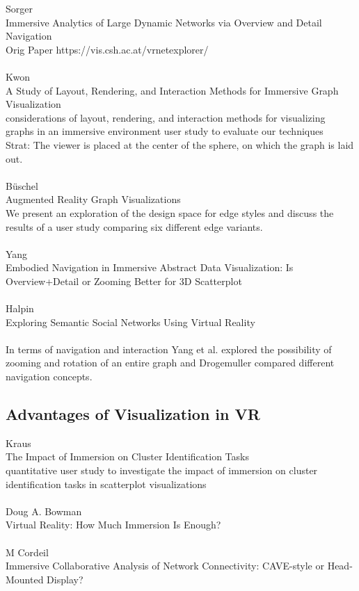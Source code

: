 Sorger\\
Immersive Analytics of Large Dynamic Networks via Overview and Detail Navigation\\
Orig Paper https://vis.csh.ac.at/vrnetexplorer/\\
\\
Kwon\\
A Study of Layout, Rendering, and Interaction Methods for Immersive Graph Visualization\\
considerations of layout, rendering, and interaction methods for visualizing graphs in an  immersive environment user study to evaluate our techniques\\
Strat: The viewer is placed at the center of the sphere, on which the graph is laid out.\\
\\
Büschel\\
Augmented Reality Graph Visualizations\\
We present an exploration of the design space for edge styles and discuss the results of a user study comparing six different edge variants.\\
\\
Yang\\
Embodied Navigation in Immersive Abstract Data Visualization:
Is Overview+Detail or Zooming Better for 3D Scatterplot\\
\\
Halpin\\
Exploring Semantic Social Networks Using Virtual Reality\\
\\

In terms of navigation and interaction Yang et al. \cite{yang_embodied_2020} explored the possibility of zooming and rotation of an entire graph and Drogemuller \cite{drogemuller_examining_2020} compared different navigation concepts.

\subsection{Advantages of Visualization in VR}
Kraus\\
The Impact of Immersion on Cluster Identification Tasks\\
quantitative user study to investigate the impact of immersion on cluster identification tasks in scatterplot visualizations\\
\\
Doug A. Bowman\\
Virtual Reality: How Much Immersion Is Enough?\\
\\
M Cordeil\\
Immersive Collaborative Analysis of Network Connectivity: CAVE-style or Head-Mounted Display?\\
\\

